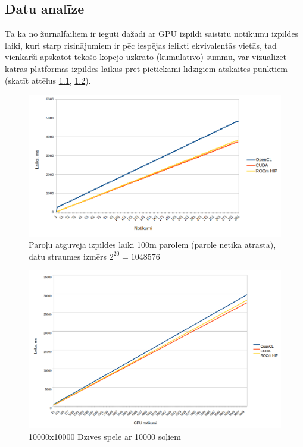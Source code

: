 \begin{center}
    \chapter{Datu analīze}
\end{center}

Tā kā no žurnālfailiem ir iegūti dažādi ar GPU izpildi saistītu notikumu
izpildes laiki, kuri starp risinājumiem ir pēc iespējas ielikti ekvivalentās
vietās, tad vienkārši apskatot tekošo kopējo uzkrāto (kumulatīvo) summu,
var vizualizēt katras platformas izpildes laikus pret pietiekami
līdzīgiem atskaites punktiem (skatīt attēlus \ref{img:sha256_100m_not_found_cum},
\ref{img:gol_10k10k_10k_steps_cum}).

\begin{figure}[!ht]
    \centering
    \includegraphics[width=\textwidth]{images/sha256_100m_not_found.png}
    \caption{Paroļu atguvēja izpildes laiki 100m parolēm (parole netika
    atrasta), datu straumes izmērs \( 2^{20} = 1048576\)}
    \label{img:sha256_100m_not_found_cum}
\end{figure}

\begin{figure}[!ht]
    \centering
    \includegraphics[width=\textwidth]{images/gol_10k_by_10k_10ksteps.png}
    \caption{10000x10000 Dzīves spēle ar 10000 soļiem}
    \label{img:gol_10k10k_10k_steps_cum}
\end{figure}

